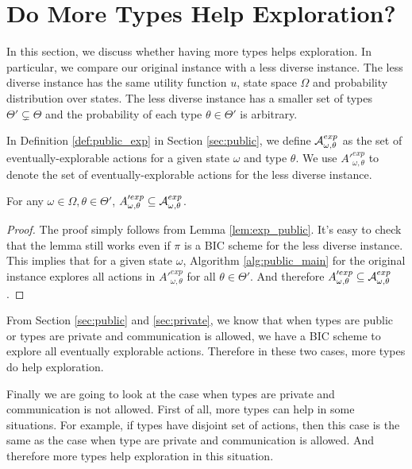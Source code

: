 
\section{Do More Types Help Exploration?}

In this section, we discuss whether having more types helps exploration. In particular, we compare our original instance with a less diverse instance. The less diverse instance has the same utility function $u$, state space $\varOmega$ and probability distribution over states. The less diverse instance has a smaller set of types $\varTheta' \subsetneq \varTheta$ and the probability of each type $\theta \in \varTheta'$ is arbitrary. 

In Definition \ref{def:public_exp} in Section \ref{sec:public}, we define $\mathcal{A}^{exp}_{\omega,\theta}$ as the set of eventually-explorable actions for a given state $\omega$ and type $\theta$. We use $A'^{exp}_{\omega,\theta}$ to denote the set of eventually-explorable actions for the less diverse instance. 

\begin{claim}
For any $\omega \in \varOmega, \theta \in \varTheta'$, $A'^{exp}_{\omega,\theta} \subseteq \mathcal{A}^{exp}_{\omega,\theta}$. 
\end{claim}

\begin{proof}
The proof simply follows from Lemma \ref{lem:exp_public}. It's easy to check that the lemma still works even if $\pi$ is a BIC scheme for the less diverse instance. This implies that for a given state $\omega$, Algorithm \ref{alg:public_main} for the original instance explores all actions in $A'^{exp}_{\omega,\theta}$ for all $\theta \in \varTheta'$. And therefore $A'^{exp}_{\omega,\theta} \subseteq \mathcal{A}^{exp}_{\omega,\theta}$.
\end{proof}

From Section \ref{sec:public} and \ref{sec:private}, we know that when types are public or types are private and communication is allowed, we have a BIC scheme to explore all eventually explorable actions. Therefore in these two cases, more types do help exploration.

Finally we are going to look at the case when types are private and communication is not allowed. First of all, more types can help in some situations. For example, if types have disjoint set of actions, then this case is the same as the case when type are private and communication is allowed. And therefore more types help exploration in this situation. 

